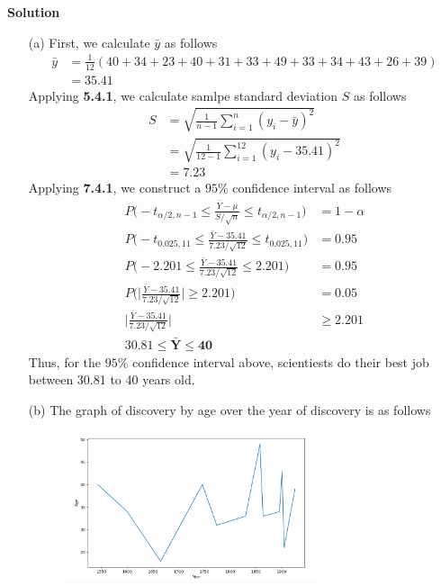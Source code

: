 \documentclass{uofa-eng-assignment}
\begin{document}
\begin{enumerate}
        \textbf{Solution} \\
        \begin{itemize}
            \item[(a)] First, we calculate $\bar{y}$ as follows
                \begin{align*}
                    \bar{y} & = \frac{1}{12}(40 + 34 + 23 + 40 + 31 + 33 + 49 + 33 + 34 + 43 + 26 + 39) \\
                            & = 35.41
                \end{align*}
                Applying \textbf{5.4.1}, we calculate samlpe standard deviation $S$ as follows
                \begin{align*}
                    S & = \sqrt{\frac{1}{n-1} \sum_{i=1}^{n} (y_i - \bar{y})^2} \\
                      & = \sqrt{\frac{1}{12-1} \sum_{i=1}^{12} (y_i - 35.41)^2} \\
                      & = 7.23
                \end{align*}
                Applying \textbf{7.4.1}, we construct a $95\%$ confidence interval as follows
                \begin{align*}
                    P\big(-t_{\alpha/2, n-1} \leq \frac{\bar{Y} - \mu}{S/\sqrt{n}} \leq t_{\alpha/2, n-1} \big) & = 1 - \alpha \\
                    P\big(-t_{0.025, 11} \leq \frac{\bar{Y} - 35.41}{7.23/\sqrt{12}} \leq t_{0.025, 11} \big)   & = 0.95       \\
                    P\big(-2.201 \leq \frac{\bar{Y} - 35.41}{7.23/\sqrt{12}} \leq 2.201 \big)                   & = 0.95       \\
                    P\big(\big| \frac{\bar{Y} - 35.41}{7.23/\sqrt{12}} \big| \geq 2.201 \big)                   & = 0.05       \\
                    \big| \frac{\bar{Y} - 35.41}{7.23/\sqrt{12}} \big|                                          & \geq 2.201   \\
                    \boldsymbol{30.81 \leq \bar{Y} \leq 40}
                \end{align*}
                Thus, for the $95\%$ confidence interval above, scientiests do their best job between 30.81 to 40 years old.
                \item[(b)]The graph of discovery by age over the year of discovery is as follows
                \begin{figure}[h]
                    \centering
                    \includegraphics[width=0.7\textwidth]{7.4.2}

\end{figure}
\end{itemize}
\end{enumerate}
\end{document}

